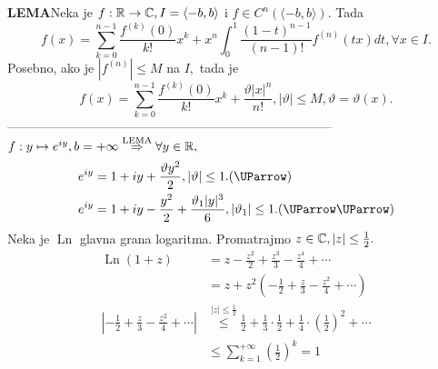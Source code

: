 \documentclass{article}
\newcommand{\Ln}{\operatorname{Ln}}
\begin{document}
\textbf{LEMA}\newline Neka je \(f:\Bbb R\to\Bbb C,I=\langle -b,b\rangle\) i \(f\in C^n\left(\langle -b,b\rangle\right).\) Tada \[f(x)=\sum_{k=0}^{n-1}\frac{f^{(k)}(0)}{k!}x^k+x^n\int_0^1\frac{(1-t)^{n-1}}{(n-1)!}f^{(n)}(tx)dt,\forall x\in I.\] Posebno, ako je \(\left|f^{(n)}\right|\le M\) na \(I,\) tada je \[f(x)=\sum_{k=0}^{n-1}\frac{f^{(k)}(0)}{k!}x^k+\frac{\vartheta|x|^n}{n!},|\vartheta|\le M,\vartheta=\vartheta(x).\] -----------------------------------------------------------------------------\newline\newline  
\(f:y\mapsto e^{iy},b=+\infty\overset{\text{LEMA}}{\Rightarrow}\forall y\in\Bbb R,\)\[\begin{aligned}e^{iy}&=1+iy+\frac{\vartheta y^2}2,|\vartheta|\le 1.\text{(\UParrow)}\\e^{iy}&=1+iy-\frac{y^2}2+\frac{\vartheta_1|y|^3}6,|\vartheta_1|\le 1.\text{(\UParrow\UParrow)}\end{aligned}\] Neka je \(\Ln \) glavna grana logaritma. Promatrajmo \(z\in\Bbb C,|z|\le\frac12.\) \[\begin{aligned}\Ln (1+z)&=z-\frac{z^2}2+\frac{z^3}3-\frac{z^4}4+\cdots\\&=z+z^2\left(-\frac12+\frac{z}3-\frac{z^2}4+\cdots\right)\\\left|-\frac12+\frac{z}3-\frac{z^2}4+\cdots\right|&\overset{|z|\le\frac12}{\le}\frac12+\frac13\cdot\frac12+\frac14\cdot\left(\frac12\right)^2+\cdots\\&\le\sum_{k=1}^{+\infty}\left(\frac12\right)^k=1\end{aligned}\]
\end{document}
